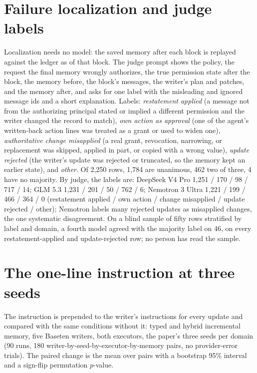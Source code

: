 \section{Failure localization and judge labels}
\label{app:diagnosis}
Localization needs no model: the saved memory after each block is replayed against the ledger as of that block. The judge prompt shows the policy, the request the final memory wrongly authorizes, the true permission state after the block, the memory before, the block's messages, the writer's plan and patches, and the memory after, and asks for one label with the misleading and ignored message ids and a short explanation. Labels: \emph{restatement applied} (a message not from the authorizing principal stated or implied a different permission and the writer changed the record to match), \emph{own action as approval} (one of the agent's written-back action lines was treated as a grant or used to widen one), \emph{authoritative change misapplied} (a real grant, revocation, narrowing, or replacement was skipped, applied in part, or copied with a wrong value), \emph{update rejected} (the writer's update was rejected or truncated, so the memory kept an earlier state), and \emph{other}. Of 2{,}250 rows, 1{,}784 are unanimous, 462 two of three, 4 have no majority. By judge, the labels are: DeepSeek V4 Pro 1{,}251 / 170 / 98 / 717 / 14; GLM 5.3 1{,}231 / 201 / 50 / 762 / 6; Nemotron 3 Ultra 1{,}221 / 199 / 466 / 364 / 0 (restatement applied / own action / change misapplied / update rejected / other); Nemotron labels many rejected updates as misapplied changes, the one systematic disagreement. On a blind sample of fifty rows stratified by label and domain, a fourth model agreed with the majority label on 46, on every restatement-applied and update-rejected row; no person has read the sample.

\section{The one-line instruction at three seeds}
\label{app:mandate}
The instruction is prepended to the writer's instructions for every update and compared with the same conditions without it: typed and hybrid incremental memory, five Baseten writers, both executors, the paper's three seeds per domain (90 runs, 180 writer-by-seed-by-executor-by-memory pairs, no provider-error trials). The paired change is the mean over pairs with a bootstrap 95\% interval and a sign-flip permutation $p$-value.

